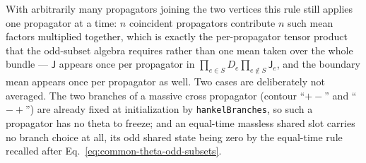 \documentclass[11pt,a4paper]{article}
\begin{document}
With arbitrarily many propagators joining the two vertices this rule still applies one propagator at a time: $n$ coincident propagators contribute $n$ such mean factors multiplied together, which is exactly the per-propagator tensor product that the odd-subset algebra requires rather than one mean taken over the whole bundle --- $\mathsf J$ appears once per propagator in $\prod_{e\in S}D_e\prod_{e\notin S}\mathsf J_e$, and the boundary mean appears once per propagator as well. Two cases are deliberately not averaged. The two branches of a massive cross propagator (contour ``$+-$'' and ``$-+$'') are already fixed at initialization by \texttt{hankelBranches}, so such a propagator has no theta to freeze; and an equal-time massless shared slot carries no branch choice at all, its odd shared state being zero by the equal-time rule recalled after Eq.~\eqref{eq:common-theta-odd-subsets}.
\end{document}
